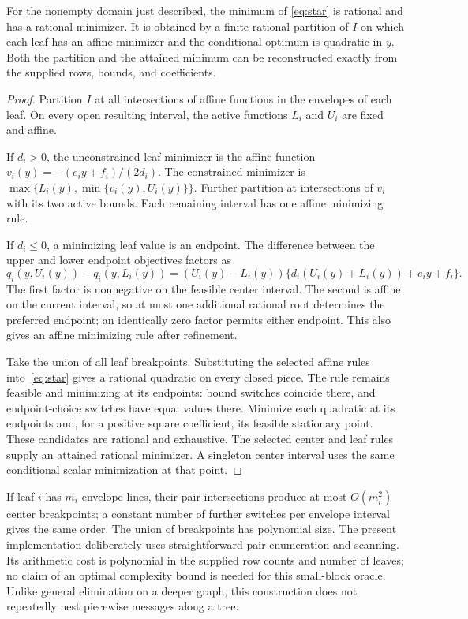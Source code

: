 \begin{theorem}\label{thm:star}
For the nonempty domain just described, the minimum of
\eqref{eq:star} is rational and has a rational minimizer. It is obtained
by a finite rational partition of $I$ on which each leaf has an affine
minimizer and the conditional optimum is quadratic in $y$. Both the
partition and the attained minimum can be reconstructed exactly from
the supplied rows, bounds, and coefficients.
\end{theorem}
\begin{proof}
Partition $I$ at all intersections of affine functions in the envelopes
of each leaf. On every open resulting interval, the active functions
$L_i$ and $U_i$ are fixed and affine.

If $d_i>0$, the unconstrained leaf minimizer is the affine function
$v_i(y)=-(e_iy+f_i)/(2d_i)$. The constrained minimizer is
$\max\{L_i(y),\min\{v_i(y),U_i(y)\}\}$. Further partition at
intersections of $v_i$ with its two active bounds. Each remaining
interval has one affine minimizing rule.

If $d_i\le0$, a minimizing leaf value is an endpoint. The difference
between the upper and lower endpoint objectives factors as
\[
q_i(y,U_i(y))-q_i(y,L_i(y))
=(U_i(y)-L_i(y))
\{d_i(U_i(y)+L_i(y))+e_iy+f_i\}.
\]
The first factor is nonnegative on the feasible center interval. The
second is affine on the current interval, so at most one additional
rational root determines the preferred endpoint; an identically zero
factor permits either endpoint. This also gives an affine minimizing
rule after refinement.

Take the union of all leaf breakpoints. Substituting the selected affine
rules into~\eqref{eq:star} gives a rational quadratic on every closed
piece. The rule remains feasible and minimizing at its endpoints:
bound switches coincide there, and endpoint-choice switches have equal
values there. Minimize each quadratic at its endpoints and, for a
positive square coefficient, its feasible stationary point. These
candidates are rational and exhaustive. The selected center and leaf
rules supply an attained rational minimizer. A singleton center interval
uses the same conditional scalar minimization at that point.
\end{proof}

If leaf $i$ has $m_i$ envelope lines, their pair intersections produce
at most $O(m_i^2)$ center breakpoints; a constant number of further
switches per envelope interval gives the same order. The union of
breakpoints has polynomial size. The present implementation deliberately
uses straightforward pair enumeration and scanning. Its arithmetic
cost is polynomial in the supplied row counts and number of leaves;
no claim of an optimal complexity bound is needed for this small-block
oracle. Unlike general elimination on a deeper graph, this construction
does not repeatedly nest piecewise messages along a tree.

